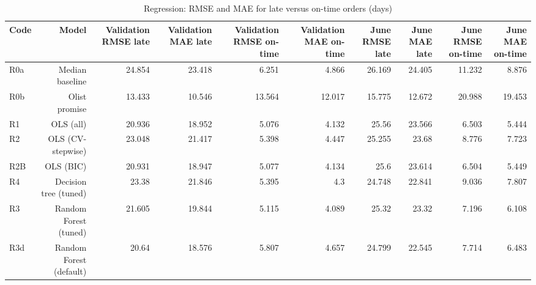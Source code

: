 \begin{table}[htbp]
\centering
\small
\caption{Regression: RMSE and MAE for late versus on-time orders (days)}
\begin{tabular}{lrrrrrrrrr}
\toprule
Code & Model & Validation RMSE late & Validation MAE late & Validation RMSE on-time & Validation MAE on-time & June RMSE late & June MAE late & June RMSE on-time & June MAE on-time \\
\midrule
R0a & Median baseline & 24.854 & 23.418 & 6.251 & 4.866 & 26.169 & 24.405 & 11.232 & 8.876 \\
R0b & Olist promise & 13.433 & 10.546 & 13.564 & 12.017 & 15.775 & 12.672 & 20.988 & 19.453 \\
R1 & OLS (all) & 20.936 & 18.952 & 5.076 & 4.132 & 25.56 & 23.566 & 6.503 & 5.444 \\
R2 & OLS (CV-stepwise) & 23.048 & 21.417 & 5.398 & 4.447 & 25.255 & 23.68 & 8.776 & 7.723 \\
R2B & OLS (BIC) & 20.931 & 18.947 & 5.077 & 4.134 & 25.6 & 23.614 & 6.504 & 5.449 \\
R4 & Decision tree (tuned) & 23.38 & 21.846 & 5.395 & 4.3 & 24.748 & 22.841 & 9.036 & 7.807 \\
R3 & Random Forest (tuned) & 21.605 & 19.844 & 5.115 & 4.089 & 25.32 & 23.32 & 7.196 & 6.108 \\
R3d & Random Forest (default) & 20.64 & 18.576 & 5.807 & 4.657 & 24.799 & 22.545 & 7.714 & 6.483 \\
\bottomrule
\end{tabular}
\par\smallskip\begin{minipage}{\linewidth}\footnotesize \end{minipage}
\end{table}

